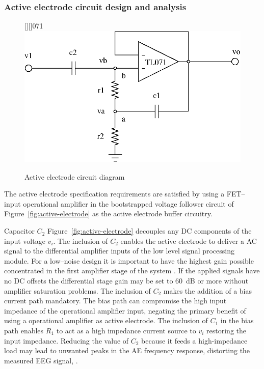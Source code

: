 \subsubsection{Active electrode circuit design and analysis}
\begin{figure}[htbp]
	\begin{center}
	\psfrag{+}{+}		
	\psfrag{-}{--}		
	[][]{071}
	\includegraphics[]{active-electrode.eps}
	\caption{Active electrode circuit diagram \cite{buffer}}
	\label{fig:active-electrode}
	\end{center}
\end{figure}
The active electrode specification requirements are satisfied by using
a FET--input operational amplifier in the bootstrapped voltage
follower circuit of Figure~\vref{fig:active-electrode} as the active
electrode buffer circuitry.

Capacitor $C_2$ Figure~\vref{fig:active-electrode} decouples any DC
components of the input voltage $v_i$. The inclusion of $C_2$ enables
the active electrode to deliver a AC signal to the differential
amplifier inputs of the low level signal processing module. For a
low--noise design it is important to have the highest gain possible
concentrated in the first amplifier stage of the system
\cite{buffer}. If the applied signals have no DC offsets the
differential stage gain may be set to 60~dB or more without amplifier
saturation problems. The inclusion of $C_2$ makes the addition of a
bias current path mandatory. The bias path can compromise the high
input impedance of the operational amplifier input, negating the
primary benefit of using a operational amplifier as active
electrode. The inclusion of $C_1$ in the bias path enables $R_1$ to
act as a high impedance current source to $v_i$ restoring the input
impedance. Reducing the value of $C_2$ because it feeds a
high-impedance load may lead to unwanted peaks in the AE frequency
response, distorting the measured EEG signal, \cite[p183-184]{art}.

